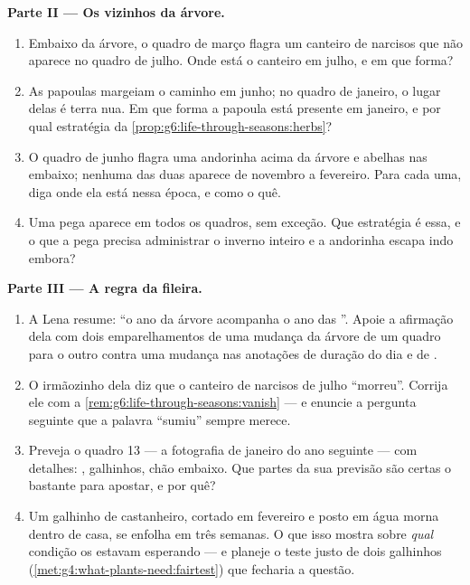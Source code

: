 \begin{problem}
\medskip\noindent\textbf{Parte II --- Os vizinhos da árvore.}
\begin{enumerate}[resume]
  \item Embaixo da árvore, o quadro de março flagra um canteiro de
        narcisos que não aparece no quadro de julho. Onde está o
        canteiro em julho, e em que forma?
  \item As papoulas margeiam o caminho em junho; no quadro de
        janeiro, o lugar delas é terra nua. Em que forma a papoula
        está presente em janeiro, e por qual estratégia da
        \cref{prop:g6:life-through-seasons:herbs}?
  \item O quadro de junho flagra uma andorinha acima da árvore e
        abelhas nas  embaixo; nenhuma das duas aparece de
        novembro a fevereiro. Para cada uma, diga onde ela está
        nessa época, e como o quê.
  \item Uma pega aparece em todos os quadros, sem exceção. Que
        estratégia  é essa, e o que a pega precisa administrar
        o inverno inteiro e a andorinha escapa indo embora?
\end{enumerate}

\medskip\noindent\textbf{Parte III --- A regra da fileira.}
\begin{enumerate}[resume]
  \item A Lena resume: ``o ano da árvore acompanha o ano das
        ''. Apoie a afirmação dela com dois emparelhamentos
        de uma mudança da árvore de um quadro para o outro contra uma
        mudança nas anotações de duração do dia e de .
  \item O irmãozinho dela diz que o canteiro de narcisos de julho
        ``morreu''. Corrija ele com a
        \cref{rem:g6:life-through-seasons:vanish} --- e enuncie a
        pergunta seguinte que a palavra ``sumiu'' sempre merece.
  \item Preveja o quadro 13 --- a fotografia de janeiro do ano
        seguinte --- com detalhes: , galhinhos, chão embaixo.
        Que partes da sua previsão são certas o bastante para
        apostar, e por quê?
  \item Um galhinho de castanheiro, cortado em fevereiro e posto em
        água morna dentro de casa, se enfolha em três semanas. O que
        isso mostra sobre \emph{qual} condição os  estavam
        esperando --- e planeje o teste justo de dois galhinhos
        (\cref{met:g4:what-plants-need:fairtest}) que fecharia a
        questão.
\end{enumerate}
\end{problem}
